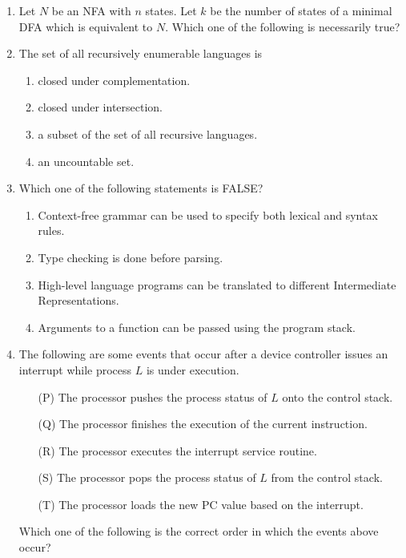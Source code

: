 \documentclass[journal,12pt,onecolumn]{IEEEtran}
\theoremstyle{remark}
\begin{document}
\begin{enumerate}
	\item Let $N$ be an NFA with $n$ states. Let $k$ be the number of states of a minimal DFA which is equivalent to $N$. Which one of the following is necessarily true?
	
	\hfill{}
	\begin{enumerate}
	\end{enumerate}
	
	\item The set of all recursively enumerable languages is
	
	\hfill{\brak{\text{GATE CS 2018}}}
	\begin{enumerate}
		\item closed under complementation.
		\item closed under intersection.
		\item a subset of the set of all recursive languages.
		\item an uncountable set.
	\end{enumerate}
	
	\item Which one of the following statements is FALSE?
	
	\hfill{}
	\begin{enumerate}
		\item Context-free grammar can be used to specify both lexical and syntax rules.
		\item Type checking is done before parsing.
		\item High-level language programs can be translated to different Intermediate Representations.
		\item Arguments to a function can be passed using the program stack.
	\end{enumerate}
	
	\item The following are some events that occur after a device controller issues an interrupt while process $L$ is under execution.
	\begin{enumerate}[label=\brak{\Alph*}]
		\item[(P)] The processor pushes the process status of $L$ onto the control stack.
		\item[(Q)] The processor finishes the execution of the current instruction.
		\item[(R)] The processor executes the interrupt service routine.
		\item[(S)] The processor pops the process status of $L$ from the control stack.
		\item[(T)] The processor loads the new PC value based on the interrupt.
	\end{enumerate}
	Which one of the following is the correct order in which the events above occur?
	

\end{enumerate}
\end{document}
